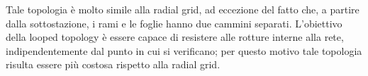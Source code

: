 \begin{figure}[h]
\end{figure}
\newpage
Tale topologia è molto simile alla radial grid, ad eccezione del fatto che, a partire dalla sottostazione, i rami e le foglie hanno due cammini separati. L'obiettivo della looped topology è essere capace di resistere alle rotture interne alla rete, indipendentemente dal punto in cui si verificano; per questo motivo tale topologia risulta essere più costosa rispetto alla radial grid.
\newline \newline
